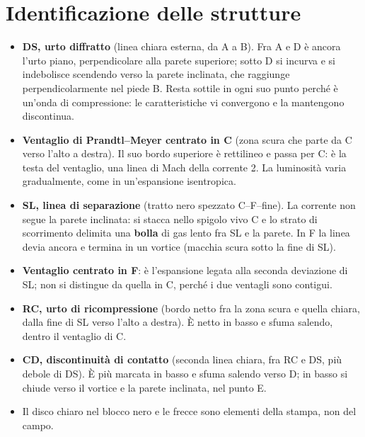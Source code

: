 \documentclass[11pt,a4paper]{article}
\begin{document}
\section{Identificazione delle strutture}
\begin{itemize}
  \item \textbf{DS, urto diffratto} (linea chiara esterna, da A a B). Fra A e D è ancora l'urto piano, perpendicolare
  alla parete superiore; sotto D si incurva e si indebolisce scendendo verso la parete inclinata, che raggiunge
  perpendicolarmente nel piede B. Resta sottile in ogni suo punto perché è un'onda di compressione: le
  caratteristiche vi convergono e la mantengono discontinua.
  \item \textbf{Ventaglio di Prandtl--Meyer centrato in C} (zona scura che parte da C verso l'alto a destra). Il suo
  bordo superiore è rettilineo e passa per C: è la testa del ventaglio, una linea di Mach della corrente 2. La
  luminosità varia gradualmente, come in un'espansione isentropica.
  \item \textbf{SL, linea di separazione} (tratto nero spezzato C--F--fine). La corrente non segue la parete
  inclinata: si stacca nello spigolo vivo C e lo strato di scorrimento delimita una \textbf{bolla} di gas lento fra SL
  e la parete. In F la linea devia ancora e termina in un vortice (macchia scura sotto la fine di SL).
  \item \textbf{Ventaglio centrato in F}: è l'espansione legata alla seconda deviazione di SL; non si distingue da
  quella in C, perché i due ventagli sono contigui.
  \item \textbf{RC, urto di ricompressione} (bordo netto fra la zona scura e quella chiara, dalla fine di SL verso
  l'alto a destra). È netto in basso e sfuma salendo, dentro il ventaglio di C.
  \item \textbf{CD, discontinuità di contatto} (seconda linea chiara, fra RC e DS, più debole di DS). È più marcata in
  basso e sfuma salendo verso D; in basso si chiude verso il vortice e la parete inclinata, nel punto E.
  \item Il disco chiaro nel blocco nero e le frecce sono elementi della stampa, non del campo.
\end{itemize}

\end{document}
